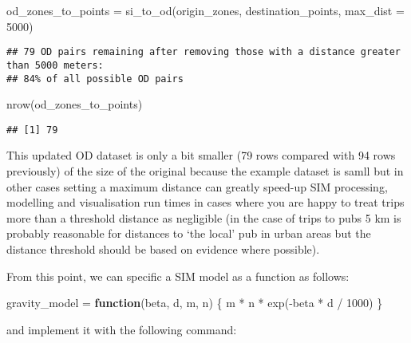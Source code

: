 \documentclass[11pt,letterpaper]{article}
\newenvironment{Shaded}{\begin{snugshade}}{\end{snugshade}}
\newcommand{\AttributeTok}[1]{\textcolor[rgb]{0.77,0.63,0.00}{#1}}
\newcommand{\ControlFlowTok}[1]{\textcolor[rgb]{0.13,0.29,0.53}{\textbf{#1}}}
\newcommand{\DecValTok}[1]{\textcolor[rgb]{0.00,0.00,0.81}{#1}}
\newcommand{\FunctionTok}[1]{\textcolor[rgb]{0.00,0.00,0.00}{#1}}
\newcommand{\NormalTok}[1]{#1}
\newcommand{\OtherTok}[1]{\textcolor[rgb]{0.56,0.35,0.01}{#1}}
\newcommand{\SpecialCharTok}[1]{\textcolor[rgb]{0.00,0.00,0.00}{#1}}
\begin{document}
\begin{Shaded}
\begin{Highlighting}[]
\NormalTok{od\_zones\_to\_points }\OtherTok{=} \FunctionTok{si\_to\_od}\NormalTok{(origin\_zones, destination\_points, }\AttributeTok{max\_dist =} \DecValTok{5000}\NormalTok{)}
\end{Highlighting}
\end{Shaded}

\begin{verbatim}
## 79 OD pairs remaining after removing those with a distance greater than 5000 meters:
## 84% of all possible OD pairs
\end{verbatim}

\begin{Shaded}
\begin{Highlighting}[]
\FunctionTok{nrow}\NormalTok{(od\_zones\_to\_points)}
\end{Highlighting}
\end{Shaded}

\begin{verbatim}
## [1] 79
\end{verbatim}

This updated OD dataset is only a bit smaller (79 rows compared with 94 rows previously) of the size of the original because the example dataset is samll but in other cases setting a maximum distance can greatly speed-up SIM processing, modelling and visualisation run times in cases where you are happy to treat trips more than a threshold distance as negligible (in the case of trips to pubs 5 km is probably reasonable for distances to `the local' pub in urban areas but the distance threshold should be based on evidence where possible).

From this point, we can specific a SIM model as a function as follows:

\begin{Shaded}
\begin{Highlighting}[]
\NormalTok{gravity\_model }\OtherTok{=} \ControlFlowTok{function}\NormalTok{(beta, d, m, n) \{}
\NormalTok{  m }\SpecialCharTok{*}\NormalTok{ n }\SpecialCharTok{*} \FunctionTok{exp}\NormalTok{(}\SpecialCharTok{{-}}\NormalTok{beta }\SpecialCharTok{*}\NormalTok{ d }\SpecialCharTok{/} \DecValTok{1000}\NormalTok{)}
\NormalTok{\} }
\end{Highlighting}
\end{Shaded}

and implement it with the following command:
\end{document}
